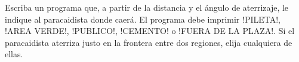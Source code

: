 Escriba un programa que,
a partir de la distancia y el ángulo de aterrizaje,
le indique al paracaidista donde caerá.
El programa debe imprimir
\li!PILETA!, \li!AREA VERDE!, \li!PUBLICO!, \li!CEMENTO! o \li!FUERA DE LA PLAZA!.
Si el paracaidista aterriza justo en la frontera entre dos regiones,
elija cualquiera de ellas.

\begin{minipage}[t]{.26\textwidth}
  
\end{minipage}
\hfill
\begin{minipage}[t]{.26\textwidth}
  
\end{minipage}
\hfill
\begin{minipage}[t]{.26\textwidth}
  
\end{minipage}

